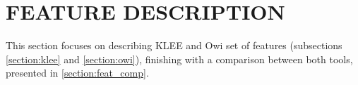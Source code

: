 \section{FEATURE DESCRIPTION}\label{chap:symbolic_execution_tools}

This section focuses on describing KLEE and Owi set of features (subsections \ref{section:klee} and \ref{section:owi}), finishing with a comparison between both tools, presented in \cref{section:feat_comp}.







